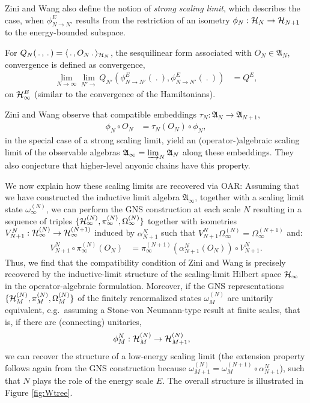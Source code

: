 \documentclass[a4paper, 11pt]{article}
\newcommand{\fA}{\mathfrak{A}}\newcommand{\cA}{\mathcal{A}}\newcommand{\dA}{\mathds{A}}\newcommand{\sA}{\mathscr{A}}
\DeclareMathOperator{\1}{\mathds{1}}
\begin{document}
Zini and Wang also define the notion of \emph{strong scaling limit}, which describes the case, when $\phi^{E}_{N\rightarrow N'}$ results from the restriction of an isometry $\phi_{N}:\mathcal{H}_{N}\rightarrow\mathcal{H}_{N+1}$ to the energy-bounded subspace.

For $Q_{N}(\!\ .\!\ ,\!\ .\!\ ) = \langle\!\ .\!\ ,O_{N}\!\ .\!\ \rangle_{\cH_{N}}$, the sesquilinear form associated with $O_{N}\in\fA_{N}$, convergence is defined as convergence,
\begin{align*}
\lim_{N\rightarrow\infty}\lim_{N'\rightarrow}Q_{N'}(\phi^{E}_{N\rightarrow N'}(\!\ .\!\ ),\phi^{E}_{N\rightarrow N'}(\!\ .\!\ )) & = Q^{E},
\end{align*}
on $\mathcal{H}^{E}_{\infty}$ (similar to the convergence of the Hamiltonians).

Zini and Wang observe \cite[p. 898]{ZiniConformalFieldTheories} that compatible embeddings $\tau_{N}:\fA_{N}\rightarrow\fA_{N+1}$,
\begin{align*}
\phi_{N}\circ O_{N} & = \tau_{N}(O_{N}) \circ \phi_{N},
\end{align*}
 in the special case of a strong scaling limit, yield an (operator-)algebraic scaling limit of the observable algebras $\fA_{\infty} = \varinjlim_{N}\fA_{N}$ along these embeddings. They also conjecture that higher-level anyonic chains have this property. 
 
 We now explain how these scaling limits are recovered via OAR: Assuming that we have constructed the inductive limit algebra $\fA_{\infty}$, together with a scaling limit state $\omega^{(N)}_{\infty}$, we can perform the GNS construction at each scale $N$ resulting in a sequence of triples $\{\mathcal{H}_{\infty}^{(N)}, \pi_{\infty}^{(N)}, \Omega_{\infty}^{(N)}\}$ together with isometries $V^{N}_{N+1}:\mathcal{H}_{\infty}^{(N)}\rightarrow\mathcal{H}_{\infty}^{(N+1)}$ induced by $\alpha^{N}_{N+1}$ such that $V^{N}_{N+1}\Omega_{\infty}^{(N)} = \Omega_{\infty}^{(N+1)}$ and:
\begin{align*}
V^{N}_{N+1}\circ \pi_{\infty}^{(N)}(O_{N}) & = \pi_{\infty}^{(N+1)}(\alpha^{N}_{N+1}(O_{N}))\circ V^{N}_{N+1}.
\end{align*}
Thus, we find that the compatibility condition of Zini and Wang is precisely recovered by the inductive-limit structure of the scaling-limit Hilbert space $\mathcal{H}_{\infty}$ in the operator-algebraic formulation. Moreover, if the GNS representations $\{\mathcal{H}_{M}^{(N)}, \pi_{M}^{(N)}, \Omega_{M}^{(N)}\}$ of the finitely renormalized states $\omega^{(N)}_{M}$ are unitarily equivalent, e.g.~assuming a Stone-von Neumann-type result at finite scales, that is, if there are (connecting) unitaries,
\begin{align*}
\phi^{N}_{M} : \mathcal{H}_{M}^{(N)} & \rightarrow \mathcal{H}_{M+1}^{(N)},
\end{align*}
we can recover the structure of a low-energy scaling limit (the extension property follows again from the GNS construction because $\omega^{(N)}_{M+1} = \omega^{(N+1)}_{M}\circ\alpha^{N}_{N+1}$), such that $N$ plays the role of the energy scale $E$. The overall structure is illustrated in Figure \ref{fig:Wtree}.
\end{document}
